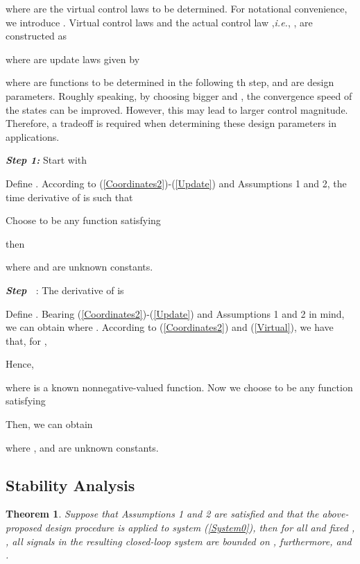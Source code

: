 \documentclass{tSYS2e}
\theoremstyle{plain}
\newtheorem{theorem}{Theorem}
\theoremstyle{definition}
\begin{document}
where  are the virtual control laws to be determined.
For notational convenience, we introduce .
Virtual control laws  and the actual control law  ,{\it i.e.}, ,
are constructed as

where  are update laws given by

where  are  functions to be determined in the
following th step,  and  are design parameters.
Roughly speaking, by choosing bigger  and , the convergence speed of the states can be improved.
However, this may lead to larger control magnitude. Therefore, a tradeoff is required when determining these design parameters in applications.

\textbf{\emph{Step 1:}} Start with

Define . According to (\ref{Coordinates2})-(\ref{Update}) and Assumptions 1 and 2, the time derivative of  is such that

Choose  to be any  function satisfying

then

where  and 
are unknown constants.

\textbf{\emph{Step }\textbf{\ }}: The derivative of  is

Define . Bearing (\ref{Coordinates2})-(\ref{Update}) and Assumptions 1 and 2 in mind, we can obtain
where .
According to (\ref{Coordinates2}) and (\ref{Virtual}), we have that, for ,

Hence,

where  is a known nonnegative-valued
function. Now we choose  to be any  function satisfying

Then, we can obtain

where ,  and 
are unknown constants.

\subsection{Stability Analysis}

\begin{theorem}
Suppose that Assumptions 1 and 2 are satisfied and that the above-proposed
design procedure is applied to system (\ref{System0}), then for all  and fixed , , all signals in
the resulting closed-loop system are bounded on , furthermore,  and .
\end{theorem}
\end{document}
